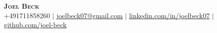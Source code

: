 
\begin{center}
    \textbf{\Huge \scshape Joel Beck} \\ \vspace{1pt}
    \small +491711858260 $|$
    \href{mailto:joelbeck07@gmail.com}{\underline{joelbeck07@gmail.com}} $|$
    \href{https://www.linkedin.com/in/joelbeck07}{\underline{linkedin.com/in/joelbeck07}} $|$
    \href{https://github.com/joel-beck}{\underline{github.com/joel-beck}}
\end{center}